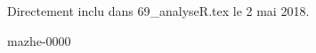 
Directement inclu dans 69_analyseR.tex le 2 mai 2018.
\DeprecationWarning


\begin{corrige}{mazhe-0000}

\end{corrige}
